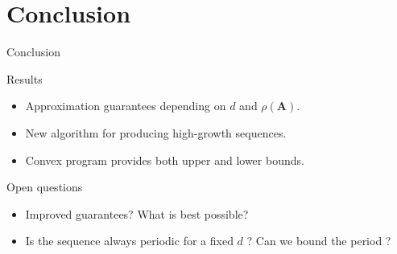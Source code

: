 \documentclass{beamer}
\newcommand{\Adj}{\mathbf{A}}
\begin{document}
  \section{Conclusion}
  \begin{frame}{Conclusion}
    \begin{block}{Results}
      \begin{itemize}
        \item Approximation guarantees depending on $d$ and $\rho(\Adj)$.
        \item New algorithm for producing high-growth sequences.
        \item Convex program provides both upper and lower bounds.
      \end{itemize}
    \end{block}
    \begin{block}{Open questions}
      \begin{itemize}
        \item Improved guarantees? What is best possible?
        \item Is the sequence always periodic for a fixed $d$ ? Can we bound the period ?
      \end{itemize}
    \end{block}
  \end{frame}
\end{document}
